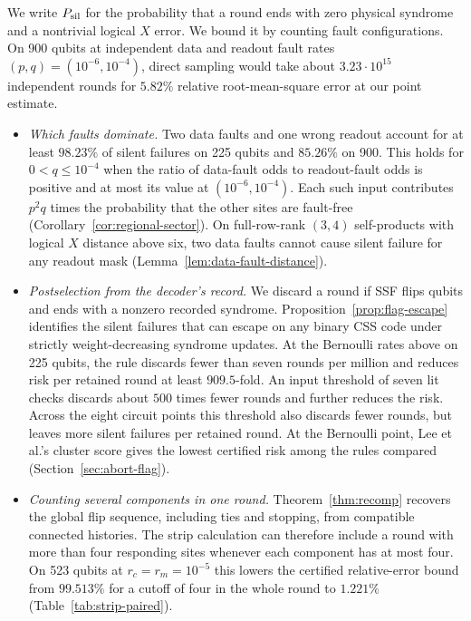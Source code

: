 \documentclass[10pt,twocolumn]{article}
\theoremstyle{definition}
\begin{document}
We write $P_{\rm sil}$ for the probability that a round ends with
zero physical syndrome and a nontrivial logical $X$ error. We bound
it by counting fault configurations. On 900 qubits at independent
data and readout fault rates $(p,q)=(10^{-6},10^{-4})$, direct
sampling would take about $3.23\cdot10^{15}$ independent rounds for
$5.82\%$ relative root-mean-square error at our point estimate.

\begin{itemize}
\setlength{\itemsep}{3pt}
\item \emph{Which faults dominate.} Two data faults and one wrong
readout account for at least $98.23\%$ of silent failures on 225
qubits and $85.26\%$ on 900. This holds for $0<q\le10^{-4}$ when
the ratio of data-fault odds to readout-fault odds is positive and
at most its value at $(10^{-6},10^{-4})$. Each such input contributes
$p^2q$ times the probability that the other sites are fault-free
(Corollary~\ref{cor:regional-sector}). On full-row-rank $(3,4)$
self-products with logical $X$ distance above six, two data faults
cannot cause silent failure for any readout mask
(Lemma~\ref{lem:data-fault-distance}).
\item \emph{Postselection from the decoder's record.} We discard a
round if SSF flips qubits and ends with a nonzero recorded syndrome.
Proposition~\ref{prop:flag-escape} identifies the silent failures
that can escape on any binary CSS code under strictly
weight-decreasing syndrome updates. At the Bernoulli rates above
on 225 qubits, the rule discards fewer than seven rounds per million
and reduces risk per retained round at least $909.5$-fold. An input
threshold of seven lit checks discards about $500$ times fewer rounds
and further reduces the risk. Across the eight circuit points this
threshold also discards fewer rounds, but leaves more silent failures per
retained round. At the Bernoulli point, Lee et al.'s cluster score
gives the lowest certified risk among the rules compared
(Section~\ref{sec:abort-flag}).
\item \emph{Counting several components in one round.}
Theorem~\ref{thm:recomp} recovers the global flip sequence, including
ties and stopping, from compatible connected histories. The strip
calculation can therefore include a round with more than four
responding sites whenever each component has at most four. On 523
qubits at $r_c=r_m=10^{-5}$ this lowers the certified relative-error
bound from $99.513\%$ for a cutoff of four in the whole round to
$1.221\%$ (Table~\ref{tab:strip-paired}).
\end{itemize}
\end{document}

